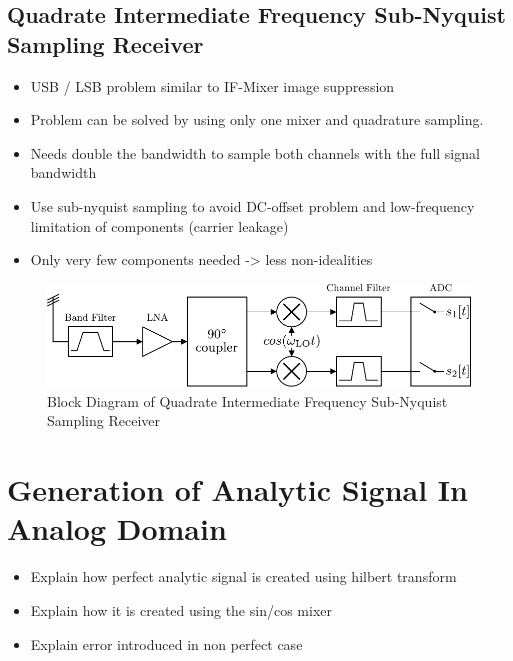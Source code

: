 \subsection{Quadrate Intermediate Frequency Sub-Nyquist Sampling Receiver}
\begin{itemize}
\item USB / LSB problem similar to IF-Mixer image suppression
\item Problem can be solved by using only one mixer and quadrature sampling.
\item Needs double the bandwidth to sample both channels with the full
  signal bandwidth
\item Use sub-nyquist sampling to avoid DC-offset problem and low-frequency
  limitation of components (carrier leakage)
\item Only very few components needed -> less non-idealities
\end{itemize}

\begin{figure}[ht]
  \centering
  \includegraphics[width=\textwidth]{figures/quad_if_rx_block_diagram}
  \caption{Block Diagram of Quadrate Intermediate Frequency Sub-Nyquist Sampling Receiver}
  \label{fig:rx_quad_if_bd}
\end{figure}

\section{Generation of Analytic Signal In Analog Domain}
\begin{itemize}
\item Explain how perfect analytic signal is created using hilbert transform
\item Explain how it is created using the sin/cos mixer
\item Explain error introduced in non perfect case
\end{itemize}
